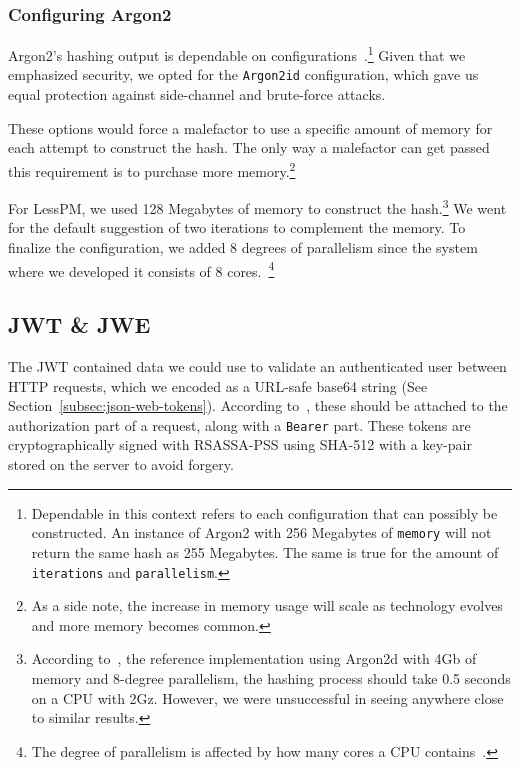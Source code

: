 \subsubsection{Configuring Argon2}
Argon2's hashing output is dependable on
configurations~\cite{argon2specs}.\footnote{
  Dependable in this context refers to each configuration that can
  possibly be constructed.
  An instance of Argon2 with 256 Megabytes of \texttt{memory} will not return
  the same hash as 255 Megabytes.
  The same is true for the amount of \texttt{iterations} and
  \texttt{parallelism}.
}
Given that we emphasized security, we opted for the \texttt{Argon2id}
configuration, which gave us equal protection against side-channel and
brute-force attacks.

These options would force a malefactor to use a specific amount of memory for
each attempt to construct the hash.
The only way a malefactor can get passed this requirement is to purchase more
memory.\footnote{
  As a side note, the increase in memory usage will scale as technology evolves
  and more memory becomes common.
}

For LessPM, we used 128 Megabytes of memory to construct the hash.\footnote{
  According to~\cite{argon2specs}, the reference implementation using Argon2d
  with 4Gb of memory and 8-degree parallelism, the hashing process should take
  0.5 seconds on a CPU with 2Gz. However, we were unsuccessful in seeing
  anywhere close to similar results.
}
We went for the default suggestion of two iterations to complement the memory.
To finalize the configuration, we added 8 degrees of parallelism since the
system where we developed it consists of 8 cores.~\footnote{
  The degree of parallelism is affected by how many cores a CPU
  contains~\cite{argon2specs}.
}

\subsection{JWT \& JWE}\label{subsec:jwt}
The JWT contained data we could use to validate an authenticated user between
HTTP requests, which we encoded as a URL-safe base64 string
(See Section~\ref{subsec:json-web-tokens}).
According to~\cite{RFC7519}, these should be attached to the authorization part
of a request, along with a \texttt{Bearer} part.
These tokens are cryptographically signed with RSASSA-PSS using SHA-512 with a
key-pair stored on the server to avoid forgery.


